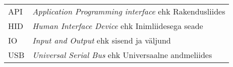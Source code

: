 \begin{longtable}{p{3cm}p{10cm}}
API&\textit{Application Programming interface} ehk Rakendusliides\\
HID&\textit{Human Interface Device} ehk Inimliidesega seade\\
IO&\textit{Input and Output} ehk sisend ja väljund\\
USB&\textit{Universal Serial Bus} ehk Universaalne andmeliides\\
\end{longtable}
\addtocounter{table}{-1} 
